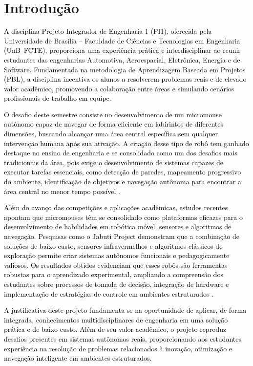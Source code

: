 \chapter[Introdução]{Introdução}

\textcolor{black}{A disciplina Projeto Integrador de Engenharia 1 (PI1), oferecida pela Universidade de Brasília – Faculdade de Ciências e Tecnologias em Engenharia (UnB–FCTE), proporciona uma experiência prática e interdisciplinar ao reunir estudantes das engenharias Automotiva, Aeroespacial, Eletrônica, Energia e de Software. Fundamentada na metodologia de Aprendizagem Baseada em Projetos (PBL), a disciplina incentiva os alunos a resolverem problemas reais e de elevado valor acadêmico, promovendo a colaboração entre áreas e simulando cenários profissionais de trabalho em equipe.}

\textcolor{black}{O desafio deste semestre consiste no desenvolvimento de um micromouse autônomo capaz de navegar de forma eficiente em labirintos de diferentes dimensões, buscando alcançar uma área central específica sem qualquer intervenção humana após sua ativação. A criação desse tipo de robô tem ganhado destaque no ensino de engenharia e se consolidado como um dos desafios mais tradicionais da área, pois exige o desenvolvimento de sistemas capazes de executar tarefas essenciais, como detecção de paredes, mapeamento progressivo do ambiente, identificação de objetivos e navegação autônoma para encontrar a área central no menor tempo possível \cite{ieee_micromouse_2020}.}

\textcolor{black}{Além do avanço das competições e aplicações acadêmicas, estudos recentes apontam que micromouses têm se consolidado como plataformas eficazes para o desenvolvimento de habilidades em robótica móvel, sensores e algoritmos de navegação. Pesquisas como o Jabuti Project demonstram que a combinação de soluções de baixo custo, sensores infravermelhos e algoritmos clássicos de exploração permite criar sistemas autônomos funcionais e pedagogicamente valiosos. Os resultados obtidos evidenciam que esses robôs são ferramentas robustas para o aprendizado experimental, ampliando a compreensão dos estudantes sobre processos de tomada de decisão, integração de hardware e implementação de estratégias de controle em ambientes estruturados \cite{Projeto_Jabuti}.}

\textcolor{black}{A justificativa deste projeto fundamenta-se na oportunidade de aplicar, de forma integrada, conhecimentos multidisciplinares de engenharia em uma solução prática e de baixo custo. Além de seu valor acadêmico, o projeto reproduz desafios presentes em sistemas autônomos reais, proporcionando aos estudantes experiência na resolução de problemas relacionados à inovação, otimização e navegação inteligente em ambientes estruturados.}

